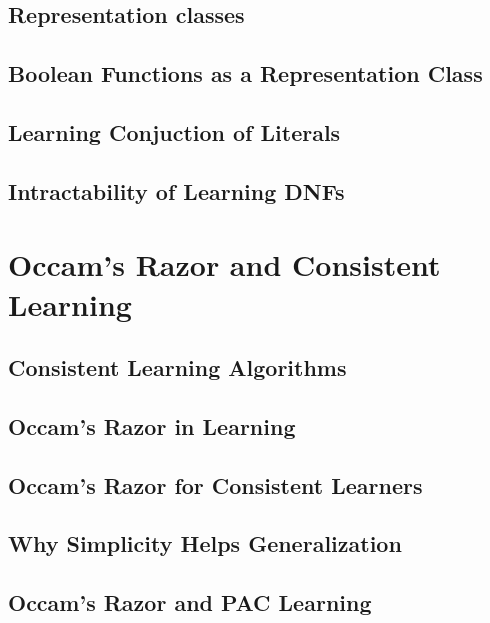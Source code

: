 \documentclass[12pt,a4paper,oneside]{book}
\begin{document}
\section{Representation classes}

\label{s_5_11}

\section{Boolean Functions as a Representation Class}

\label{s_5_12}

\section{Learning Conjuction of Literals}

\label{s_5_13}

\section{Intractability of Learning DNFs}

\label{s_5_14}

\chapter{Occam's Razor and Consistent Learning}
\label{c_6}

\section{Consistent Learning Algorithms}

\label{s_6_1}

\section{Occam's Razor in Learning}

\label{s_6_2}

\section{Occam's Razor for Consistent Learners}

\label{s_6_3}

\section{Why Simplicity Helps Generalization}

\label{s_6_4}

\section{Occam's Razor and PAC Learning}

\label{s_6_5}
\end{document}
